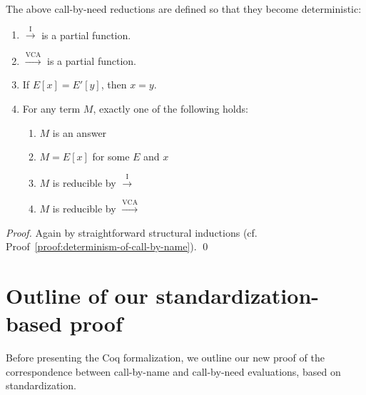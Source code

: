 \documentclass[english]{sumiilab-paper}
\newcommand{\CALLBYNEEDI}{\xrightarrow{\mathrm{I}}}
\newcommand{\CALLBYNEEDVCA}{\xrightarrow{\mathrm{VCA}}}
\newcommand{\proofname}{Proof}
\begin{document}
The above call-by-need reductions are defined so that they become deterministic:
%
\begin{lemma}\label{determinism-of-call-by-need} \qquad
	\begin{enumerate}
		\item $\CALLBYNEEDI$ is a partial function.
		\item $\CALLBYNEEDVCA$ is a partial function.
		\item If $E[x]=E'[y]$, then $x=y$. \label{enum:demands}
		\item For any term $M$, exactly one of the following holds: \label{enum:total-need}
			\begin{enumerate}
				\item $M$ is an answer
				\item $M=E[x]$ for some $E$ and $x$ \label{enum:determinism-of-call-by-need-demand}
				\item $M$ is reducible by $\CALLBYNEEDI$
				\item $M$ is reducible by $\CALLBYNEEDVCA$
			\end{enumerate}
	\end{enumerate}
\end{lemma}
%
\begin{proof}
	Again by straightforward structural inductions (cf. \proofname~\ref{proof:determinism-of-call-by-name}). \qed
\end{proof}
%
\chapter{Outline of our standardization-based proof}\label{sec:informal-proofs}
%
Before presenting the Coq formalization, we outline our new proof of the correspondence between call-by-name and call-by-need evaluations, based on standardization.
\end{document}
